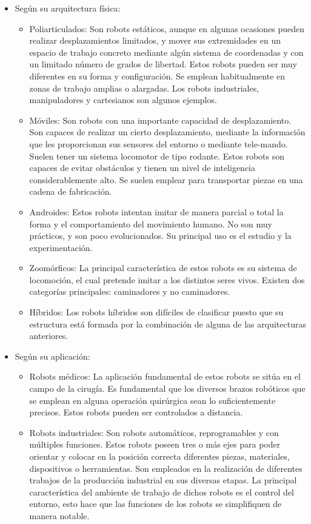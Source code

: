 \begin{itemize}
\begin{itemize}
    \end{itemize}
    \item Según su arquitectura física:
    \begin{itemize} 
    	\item Poliarticulados: Son robots estáticos, aunque en algunas ocasiones pueden realizar desplazamientos limitados, y mover sus extremidades en un espacio de trabajo concreto mediante algún sistema de coordenadas y con un limitado número de grados de libertad. Estos robots pueden ser muy diferentes en su forma y configuración. Se emplean habitualmente en zonas de trabajo amplias o alargadas. Los robots industriales, manipuladores y cartesianos son algunos ejemplos.
		\item Móviles: Son robots con una importante capacidad de desplazamiento. Son capaces de realizar un cierto desplazamiento, mediante la información que les proporcionan sus sensores del entorno o mediante tele-mando. Suelen tener un sistema locomotor de tipo rodante. Estos robots son capaces de evitar obstáculos y tienen un nivel de inteligencia considerablemente alto. Se suelen emplear para transportar piezas en una cadena de fabricación.
		\item Androides: Estos robots intentan imitar de manera parcial o total la forma y el comportamiento del movimiento humano. No son muy prácticos, y son poco evolucionados. Su principal uso es el estudio y la experimentación.
		\item Zoomórficos: La principal característica de estos robots es su sistema de locomoción, el cual pretende imitar a los distintos seres vivos. Existen dos categorías principales: caminadores y no caminadores.
		\item Híbridos: Los robots híbridos son difíciles de clasificar puesto que su estructura está formada por la combinación de alguna de las arquitecturas anteriores.
	\end{itemize}
	\item Según su aplicación:
	\begin{itemize}
		\item Robots médicos: La aplicación fundamental de estos robots se sitúa en el campo de la cirugía. Es fundamental que los diversos brazos robóticos que se emplean en alguna operación quirúrgica sean lo suficientemente precisos. Estos robots pueden ser controlados a distancia. 
		\item Robots industriales: Son robots automáticos, reprogramables y con múltiples funciones. Estos robots poseen tres o más ejes para poder orientar y colocar en la posición correcta diferentes piezas, materiales, dispositivos o herramientas. Son empleados en la realización de diferentes trabajos de la producción industrial en sus diversas etapas. La principal característica del ambiente de trabajo de dichos robots es el control del entorno, esto hace que las funciones de los robots se simplifiquen de manera notable. 

\end{itemize}
\end{itemize}
